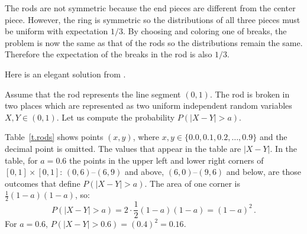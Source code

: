
The rods are not symmetric because the end pieces are different from the center piece. However, the ring is symmetric so the distributions of all three pieces must be uniform with expectation $1/3$. By choosing and coloring one of breaks, the problem is now the same as that of the rods so the distributions remain the same. Therefore the expectation of the breaks in the rod is also $1/3$.


Here is an elegant solution from \cite{stack-rods}.

Assume that the rod represents the line segment $(0,1)$. The rod is broken in two places which are represented as two uniform independent random variables $X,Y\in (0,1)$. Let us compute the probability $P(|X-Y|>a)$.

Table~\ref{t.rods} shows points $(x,y)$, where $x,y \in \{0.0, 0.1, 0.2, \ldots, 0.9\}$ and the decimal point is omitted. The values that appear in the table are $|X-Y|$. In the table, for $a=0.6$ the points in the upper left and lower right corners of $[0,1]\times [0,1]$: $(0,6)$--$(6,9)$ and above, $(6,0)$--$(9,6)$ and below, 
are those outcomes that define $P(|X-Y|>a)$. The area of one corner is $\frac{1}{2}(1-a)(1-a)$, so:
\[
P(|X-Y|>a)=2\cdot \frac{1}{2}(1-a)(1-a)=(1-a)^2\,.
\]
For $a=0.6$, $P(|X-Y|>0.6)=(0.4)^2=0.16$.

